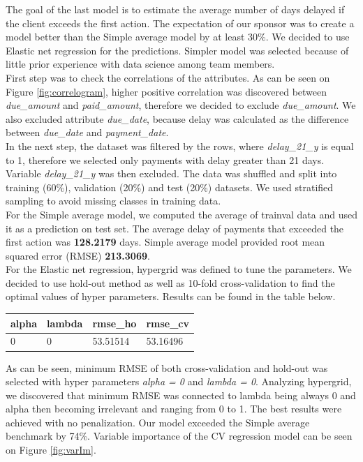 \documentclass[
]{article}
\begin{document}
The goal of the last model is to estimate the average number of days delayed if the client exceeds the first action.
The expectation of our sponsor was to create a model better than the Simple average model by at least 30\%. We decided to use Elastic net regression for the predictions. Simpler model was
selected because of little prior experience with data science among team members.\\
First step was to check the correlations of the attributes. As can be seen on Figure \ref{fig:correlogram}, higher positive correlation was discovered between \emph{due\_amount} and \emph{paid\_amount}, therefore we decided to exclude \emph{due\_amount}. We also excluded attribute \emph{due\_date}, because delay was calculated as the difference between \emph{due\_date} and \emph{payment\_date}.\\
In the next step, the dataset was filtered by the rows, where \emph{delay\_21\_y} is equal to 1, therefore we selected only payments with delay greater than 21 days. Variable \emph{delay\_21\_y} was then excluded. The data was shuffled and split into training (60\%), validation (20\%) and test (20\%) datasets. We used stratified sampling to avoid missing classes in training data.\\
For the Simple average model, we computed the average of trainval data and used it as a prediction on test set. The average delay of payments that exceeded the first action was \textbf{128.2179} days. Simple average model provided root mean squared error (RMSE) \textbf{213.3069}.\\
For the Elastic net regression, hypergrid was defined to tune the parameters. We decided to use hold-out method as well as 10-fold cross-validation to find the optimal values of hyper parameters. Results can be found in the table below.

\begin{longtable}[]{@{}llll@{}}
\toprule
alpha & lambda & rmse\_ho & rmse\_cv\tabularnewline
\midrule
\endhead
0 & 0 & 53.51514 & 53.16496\tabularnewline
\bottomrule
\end{longtable}

As can be seen, minimum RMSE of both cross-validation and hold-out was selected with hyper parameters \emph{alpha = 0} and \emph{lambda = 0}. Analyzing hypergrid, we discovered that minimum RMSE was connected to lambda being always 0 and alpha then becoming irrelevant and ranging from 0 to 1. The best results were achieved with no penalization. Our model exceeded the Simple average benchmark by 74\%. Variable importance of the CV regression model can be seen on Figure \ref{fig:varIm}.
\end{document}
